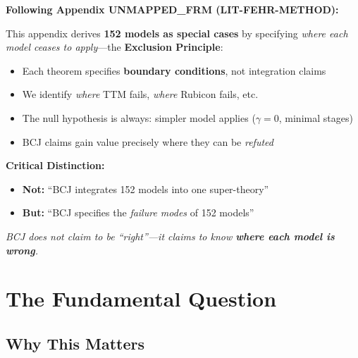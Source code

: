 \begin{tcolorbox}[colback=red!5!white, colframe=red!75!black,
    title=\textbf{Methodological Note: Boundary Specification, Not Integration}]

\textbf{Following Appendix UNMAPPED_FRM (LIT-FEHR-METHOD):}

This appendix derives \textbf{152 models as special cases} by specifying \textit{where each model ceases to apply}---the \textbf{Exclusion Principle}:

\begin{itemize}[nosep]
    \item Each theorem specifies \textbf{boundary conditions}, not integration claims
    \item We identify \textit{where} TTM fails, \textit{where} Rubicon fails, etc.
    \item The null hypothesis is always: simpler model applies ($\gamma = 0$, minimal stages)
    \item BCJ claims gain value precisely where they can be \textit{refuted}
\end{itemize}

\medskip
\textbf{Critical Distinction:}
\begin{itemize}[nosep]
    \item \textbf{Not:} ``BCJ integrates 152 models into one super-theory''
    \item \textbf{But:} ``BCJ specifies the \textit{failure modes} of 152 models''
\end{itemize}

\textit{BCJ does not claim to be ``right''---it claims to know \textbf{where each model is wrong}.}
\end{tcolorbox}



\section{The Fundamental Question}
\label{sec:bcj-fundamental}

\subsection{Why This Matters}

